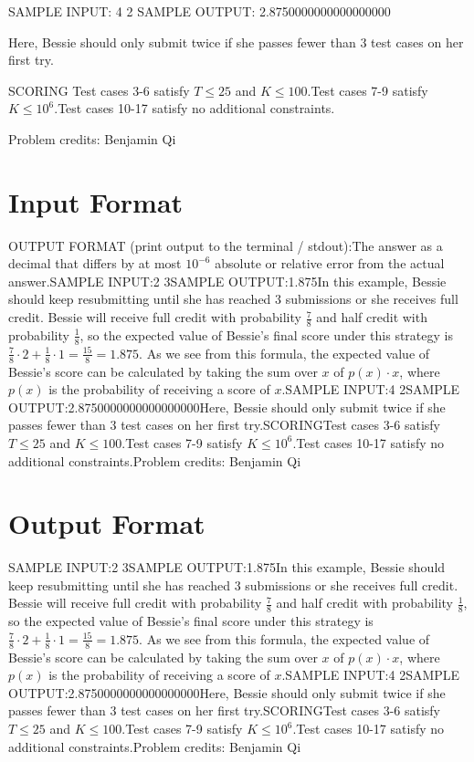 \documentclass[12pt]{article}
\begin{document}
SAMPLE INPUT:
4 2
SAMPLE OUTPUT: 
2.8750000000000000000

Here, Bessie should only submit twice if she passes fewer than $3$ test cases on
her first try.

SCORING
Test cases 3-6 satisfy $T\le 25$ and $K\le 100.$Test cases 7-9 satisfy $K\le 10^6.$Test cases 10-17 satisfy no additional constraints.


Problem credits: Benjamin Qi



\section*{Input Format}
OUTPUT FORMAT (print output to the terminal / stdout):The answer as a decimal that differs by at most $10^{-6}$ absolute or relative
error from the actual answer.SAMPLE INPUT:2 3SAMPLE OUTPUT:1.875In this example, Bessie should keep resubmitting until she has reached $3$
submissions or she  receives full credit. Bessie will receive full credit with
probability $\frac{7}{8}$ and half credit with probability $\frac{1}{8}$, so the
expected value of Bessie's  final score under this strategy is
$\frac{7}{8}\cdot 2+\frac{1}{8}\cdot 1=\frac{15}{8}=1.875$.  As we see from this
formula, the expected value of Bessie's score can be calculated by  taking the
sum over $x$ of $p(x) \cdot x$, where $p(x)$ is the probability of receiving a
score of
$x$.SAMPLE INPUT:4 2SAMPLE OUTPUT:2.8750000000000000000Here, Bessie should only submit twice if she passes fewer than $3$ test cases on
her first try.SCORINGTest cases 3-6 satisfy $T\le 25$ and $K\le 100.$Test cases 7-9 satisfy $K\le 10^6.$Test cases 10-17 satisfy no additional constraints.Problem credits: Benjamin Qi

\section*{Output Format}
SAMPLE INPUT:2 3SAMPLE OUTPUT:1.875In this example, Bessie should keep resubmitting until she has reached $3$
submissions or she  receives full credit. Bessie will receive full credit with
probability $\frac{7}{8}$ and half credit with probability $\frac{1}{8}$, so the
expected value of Bessie's  final score under this strategy is
$\frac{7}{8}\cdot 2+\frac{1}{8}\cdot 1=\frac{15}{8}=1.875$.  As we see from this
formula, the expected value of Bessie's score can be calculated by  taking the
sum over $x$ of $p(x) \cdot x$, where $p(x)$ is the probability of receiving a
score of
$x$.SAMPLE INPUT:4 2SAMPLE OUTPUT:2.8750000000000000000Here, Bessie should only submit twice if she passes fewer than $3$ test cases on
her first try.SCORINGTest cases 3-6 satisfy $T\le 25$ and $K\le 100.$Test cases 7-9 satisfy $K\le 10^6.$Test cases 10-17 satisfy no additional constraints.Problem credits: Benjamin Qi
\end{document}
